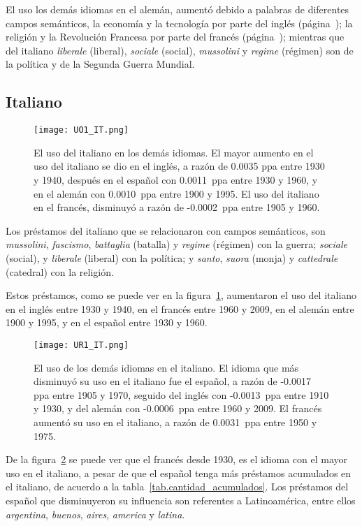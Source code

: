 El uso los demás idiomas en el alemán, aumentó debido a palabras de diferentes campos semánticos, la  economía y la tecnología  por parte del inglés (página~\pageref{EN-D}); la religión y la Revolución Francesa por parte del francés (página~\pageref{FR-D}); mientras que del italiano 
\textit{liberale} (liberal), \textit{sociale} (social), \textit{mussolini} y  \textit{regime} (régimen)
son de la política y  de la Segunda Guerra Mundial.

\label{D-GE}

\subsection{Italiano} %

\begin{figure}[h!]
	\centering
	\texttt{[image: UO1\_IT.png]}
	\caption{El uso del italiano en los demás idiomas. El mayor aumento en el uso del italiano se dio en el inglés, a razón de 0.0035 ppa entre 1930 y 1940, después en el español con 0.0011~ppa entre 1930 y 1960, y en el alemán con 0.0010~ppa entre 1900 y 1995. El uso del italiano en el francés, disminuyó a razón de -0.0002~ppa  entre 1905 y 1960.}
	\label{fig.UO_IT}
\end{figure}
	
Los préstamos del italiano que se relacionaron con campos semánticos, son \textit{mussolini}, \textit{fascismo}, \textit{battaglia} (batalla) y \textit{regime} (régimen) con la guerra; \textit{sociale} (social),  y \textit{liberale} (liberal) con la política;  y \textit{santo}, \textit{suora} (monja) y \textit{cattedrale} (catedral) con la religión.

Estos préstamos, como se puede ver en la figura~\ref{fig.UO_IT}, aumentaron el uso del italiano en el inglés entre 1930 y 1940, en el francés entre 1960 y 2009, en el alemán entre 1900 y 1995, y en el español entre 1930 y 1960.
\label{IT-D}


\begin{figure}[h!]
	\centering
	\texttt{[image: UR1\_IT.png]}
	\caption{El uso de los demás idiomas en el italiano. El idioma que más 
	disminuyó su uso en el italiano fue el español, a razón de -0.0017 ppa entre 1905 y 1970, seguido del inglés con -0.0013~ppa entre 1910 y 1930, y del alemán con -0.0006~ppa entre 1960 y 2009. El francés aumentó su uso en el italiano, a razón de 0.0031~ppa entre 1950 y 1975.}
	\label{fig.UR_IT}
\end{figure}

De la figura~\ref{fig.UR_IT} se puede ver que el francés desde 1930, es el idioma con el mayor uso en el italiano, a pesar de que el español tenga más préstamos acumulados en el italiano, de acuerdo a la tabla~\ref{tab.cantidad_acumulados}. Los préstamos del español que disminuyeron su influencia son referentes a Latinoamérica, entre ellos  \textit{argentina}, \textit{buenos}, \textit{aires}, \textit{america} y \textit{latina}.

